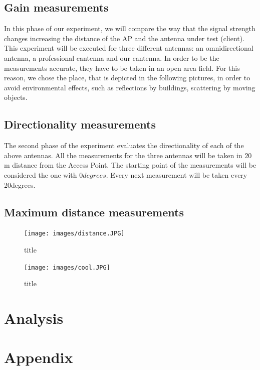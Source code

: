 \documentclass[12pt,a4paper]{article}
\begin{document}
\subsection{Gain measurements}
In this phase of our experiment, we will compare the way that the signal strength changes increasing the distance of the AP and the antenna under test (client). This experiment will be executed for three different antennas: an omnidirectional antenna, a professional cantenna and our cantenna. In order to be the measurements accurate, they have to be taken in an open area field. For this reason, we chose the place, that is depicted in the following pictures, in order to avoid environmental effects, such as reflections by buildings, scattering by moving objects.

\subsection{Directionality measurements}
The second phase of the experiment evaluates the directionality of each of the above antennas. All the measurements for the three antennas will be taken in $20$m distance from the Access Point. The starting point of the measurements will be considered the one with $0degrees$. Every next measurement will be taken every 20degrees.

\subsection{Maximum distance measurements}
\begin{figure}
	\texttt{[image: images/distance.JPG]}
	\caption{title}
	\label{distance}
\end{figure}

\begin{figure}
	\texttt{[image: images/cool.JPG]}
	\caption{title}
	\label{cool}
\end{figure}




\section{Analysis}


\section{Appendix}

\end{document}

